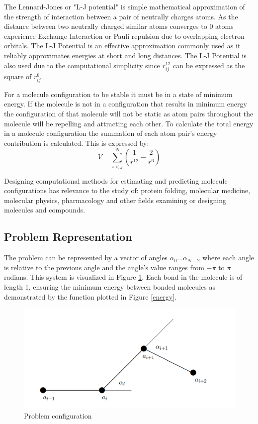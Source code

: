\documentclass[11pt]{article}
\begin{document}
    \par The Lennard-Jones or "L-J potential" is simple mathematical approximation of the strength of interaction between a pair of neutrally charges atoms. As the distance between two neutrally charged similar atoms converges to 0 atoms experience Exchange Interaction or Pauli repulsion due to overlapping electron orbitals. The L-J Potential is an effective approximation commonly used as it reliably approximates energies at short and long distances. The L-J Potential is also used due to the computational simplicity since $r_{ij}^{12}$ can be expressed as the square of $r_{ij}^6$.
    
    \par For a molecule configuration to be stable it must be in a state of minimum energy. If the molecule is not in a configuration that results in minimum energy the configuration of that molecule will not be static as atom pairs throughout the molecule will be repelling and attracting each other. To calculate the total energy in a molecule configuration the summation of each atom pair's energy contribution is calculated. This is expressed by:
    \begin{equation}
        V = \sum_{i < j}^{N}(\frac{1}{r^{12}} - \frac{2}{r^{6}})
    \end{equation}

    Designing computational methods for estimating and predicting molecule configurations has relevance to the study of: protein folding, molecular medicine, molecular physics, pharmacology and other fields examining or designing molecules and compounds.

    \subsection{Problem Representation}
    \par
    The problem can be represented by a vector of angles $\alpha_{0} ... \alpha_{N-2}$ where each angle is relative to the previous angle and the angle's value ranges from $-\pi$ to $\pi$ radians. This system is visualized in Figure \ref{atom configuration}. Each bond in the molecule is of length 1, ensuring the minimum energy between bonded molecules as demonstrated by the function plotted in Figure \ref{energy}.

    \begin{figure}[h]
        \includegraphics[scale=0.45]{configuration}
        \caption{Problem configuration}
        \label{atom configuration}
    \end{figure}
    
\end{document}
